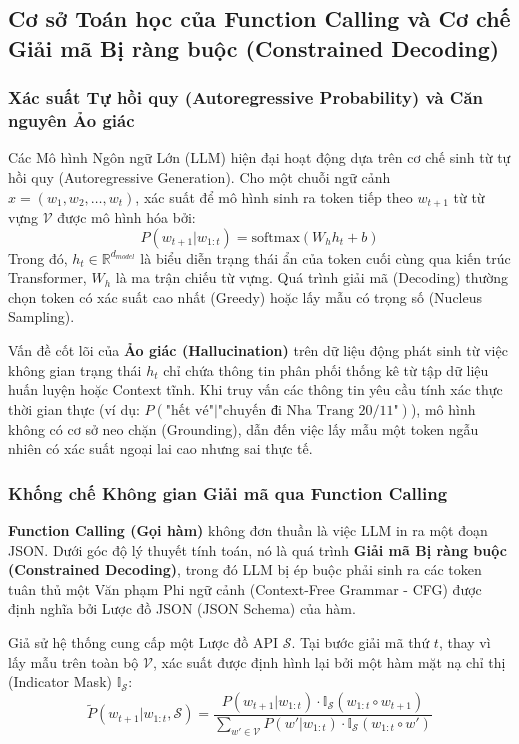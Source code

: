 \subsection{Cơ sở Toán học của Function Calling và Cơ chế Giải mã Bị ràng buộc (Constrained Decoding)}

\subsubsection{Xác suất Tự hồi quy (Autoregressive Probability) và Căn nguyên Ảo giác}
Các Mô hình Ngôn ngữ Lớn (LLM) hiện đại hoạt động dựa trên cơ chế sinh từ tự hồi quy (Autoregressive Generation). Cho một chuỗi ngữ cảnh $x = (w_1, w_2, \dots, w_t)$, xác suất để mô hình sinh ra token tiếp theo $w_{t+1}$ từ từ vựng $\mathcal{V}$ được mô hình hóa bởi:
\begin{equation}
    P(w_{t+1} | w_{1:t}) = \text{softmax}(W_h h_t + b)
\end{equation}
Trong đó, $h_t \in \mathbb{R}^{d_{model}}$ là biểu diễn trạng thái ẩn của token cuối cùng qua kiến trúc Transformer, $W_h$ là ma trận chiếu từ vựng. Quá trình giải mã (Decoding) thường chọn token có xác suất cao nhất (Greedy) hoặc lấy mẫu có trọng số (Nucleus Sampling).

Vấn đề cốt lõi của \textbf{Ảo giác (Hallucination)} trên dữ liệu động phát sinh từ việc không gian trạng thái $h_t$ chỉ chứa thông tin phân phối thống kê từ tập dữ liệu huấn luyện hoặc Context tĩnh. Khi truy vấn các thông tin yêu cầu tính xác thực thời gian thực (ví dụ: $P(\text{"hết vé"} | \text{"chuyến đi Nha Trang 20/11"})$), mô hình không có cơ sở neo chặn (Grounding), dẫn đến việc lấy mẫu một token ngẫu nhiên có xác suất ngoại lai cao nhưng sai thực tế.

\subsubsection{Khống chế Không gian Giải mã qua Function Calling}
\textbf{Function Calling (Gọi hàm)} không đơn thuần là việc LLM in ra một đoạn JSON. Dưới góc độ lý thuyết tính toán, nó là quá trình \textbf{Giải mã Bị ràng buộc (Constrained Decoding)}, trong đó LLM bị ép buộc phải sinh ra các token tuân thủ một Văn phạm Phi ngữ cảnh (Context-Free Grammar - CFG) được định nghĩa bởi Lược đồ JSON (JSON Schema) của hàm.

Giả sử hệ thống cung cấp một Lược đồ API $\mathcal{S}$. Tại bước giải mã thứ $t$, thay vì lấy mẫu trên toàn bộ $\mathcal{V}$, xác suất được định hình lại bởi một hàm mặt nạ chỉ thị (Indicator Mask) $\mathbb{I}_{\mathcal{S}}$:
\begin{equation}
    \tilde{P}(w_{t+1} | w_{1:t}, \mathcal{S}) = \frac{P(w_{t+1} | w_{1:t}) \cdot \mathbb{I}_{\mathcal{S}}(w_{1:t} \circ w_{t+1})}{\sum_{w' \in \mathcal{V}} P(w' | w_{1:t}) \cdot \mathbb{I}_{\mathcal{S}}(w_{1:t} \circ w')}
\end{equation}

